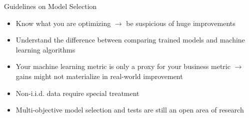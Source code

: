 \documentclass[11pt,compress,t,notes=noshow, xcolor=table]{beamer}
\begin{document}
\begin{frame}{Guidelines on Model Selection}
    \vfill
    \begin{itemize}
        \item Know what you are optimizing $\rightarrow$ be suspicious of huge improvements
        \item Understand the difference between comparing trained models and machine learning algorithms
        \item Your machine learning metric is only a proxy for your business metric $\rightarrow$ gains might not materialize in real-world improvement
        \item Non-i.i.d. data require special treatment
        \item Multi-objective model selection and tests are still an open area of research
    \end{itemize}
    \vfill
\end{frame}


\endlecture
\end{document}
